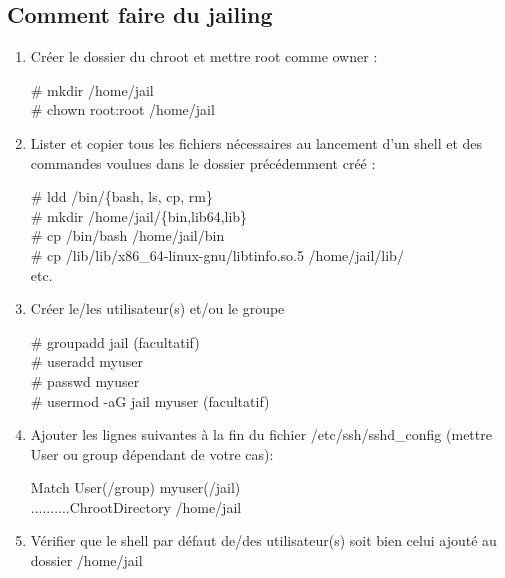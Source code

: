 \documentclass[a4paper]{article}
\begin{document}
\subsection{Comment faire du jailing}
\begin{enumerate}
    \item Créer le dossier du chroot et mettre root comme owner :\\
    \begin{example}
    \# mkdir /home/jail\\[0.1cm]
    \# chown root:root /home/jail
    \end{example}
    \item Lister et copier tous les fichiers nécessaires au lancement d'un shell et des commandes voulues dans le dossier précédemment créé :\\
    \begin{example}
    \# ldd /bin/\{bash, ls, cp, rm\}\\[0.1cm]
    \# mkdir /home/jail/\{bin,lib64,lib\}\\[0.1cm]
    \# cp /bin/bash /home/jail/bin\\[0.1cm]
    \# cp /lib/lib/x86\_64-linux-gnu/libtinfo.so.5 /home/jail/lib/\\[0.1cm]
    etc.
    \end{example}
    \item Créer le/les utilisateur(s) et/ou le groupe
    \begin{example}
    \# groupadd jail (facultatif)\\[0.1cm]
    \# useradd myuser\\[0.1cm]
    \# passwd myuser\\[0.1cm]
    \# usermod -aG jail myuser (facultatif)
    \end{example}
    \item Ajouter les lignes suivantes à la fin du fichier /etc/ssh/sshd\_config (mettre User ou group dépendant de votre cas):\\
    \begin{example}
    Match User(/group) myuser(/jail)\\
    ..........ChrootDirectory /home/jail
    \end{example}
    \item Vérifier que le shell par défaut de/des utilisateur(s) soit bien celui ajouté au dossier /home/jail
\end{enumerate}
\end{document}
